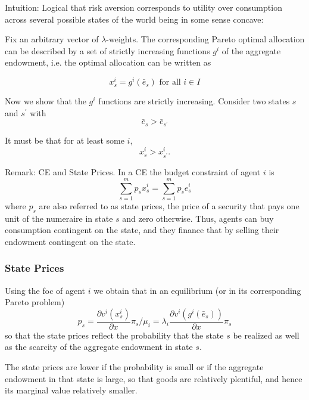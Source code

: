 \documentclass[10pt]{article}
\begin{document}
Intuition: Logical that risk aversion corresponds to 
utility over consumption across several possible states of the world 
being in some sense
concave: 

\begin{theorem}
    Fix an arbitrary vector of $\lambda$-weights.   
    The corresponding Pareto optimal allocation can be described by a set of strictly increasing functions $g^i$ of the aggregate endowment, i.e. the optimal allocation can be written as
    
    $$
    x_s^i=g^i\left(\bar{e}_s\right) \text { for all } i \in I
    $$
\end{theorem}

\begin{remark}
    Now we show that the $g^i$ functions are strictly increasing. Consider two states $s$ and $s^{\prime}$ with
    $$
    \bar{e}_s>\bar{e}_{s^{\prime}}
    $$

    It must be that for at least some $i$,
    $$
    x_s^i>x_{s^{\prime}}^i .
    $$
\end{remark}

\begin{remark}
    Remark: CE and State Prices. In a CE the budget constraint of agent $i$ is
    $$
    \sum_{s=1}^m p_s x_s^i=\sum_{s=1}^m p_s e_s^i
    $$
    where $p_s$ are also referred to as state prices, the price of a security that pays one unit of the numeraire in state $s$ and zero otherwise. Thus, agents can buy consumption contingent on the state, and they finance that by selling their endowment contingent on the state.
\end{remark}

\subsubsection{State Prices}

Using the foc of agent $i$ we obtain that in an equilibrium (or in its corresponding Pareto problem)
$$
p_s=\frac{\partial v^i\left(x_s^i\right)}{\partial x} \pi_s / \mu_i=\lambda_i \frac{\partial v^i\left(g^i\left(\bar{e}_s\right)\right)}{\partial x} \pi_s
$$
so that the state prices reflect the probability that the state $s$ be realized as well as the scarcity of the aggregate endowment in state $s$.

The state prices are lower if the probability is small or if the aggregate endowment in that state is large, so that goods are relatively plentiful, and hence its marginal value relatively smaller.
\end{document}
